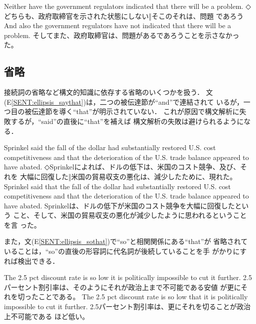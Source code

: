 \begin{SENT}
\sentE Neither have the government regulators indicated that there will 
be a problem.
\sentJ ◇どちらも、政府取締官を示された状態にしない‖そこのそれは、問題
であろう
\sentNewE And also the government regulators have not indicated 
that there will be a problem.
\sentNewJ そしてまた、政府取締官は、問題があるであろうことを示さなかった。
\label{SENT:inversion_neither}
\end{SENT}

\subsection{省略}
\label{sec:object:ellipsis}

接続詞の省略など構文的知識に依存する省略のいくつかを扱う．
文(E\ref{SENT:ellipsis_saythat})は，二つの被伝達節が``and''で連結されて
いるが，一つ目の被伝達節を導く``that''が明示されていない．
これが原因で構文解析に失敗するが，``said''の直後に``that''を補えば
構文解析の失敗は避けられるようになる．
\begin{SENT}
\sentE Sprinkel said the fall of the dollar had substantially restored 
U.S. cost competitiveness and that the deterioration of the U.S. trade 
balance appeared to have abated. 
\sentJ ◇Sprinkelによれば、ドルの低下は、米国のコスト競争、及び、それを
大幅に回復した‖米国の貿易収支の悪化は、減少したために、現れた。
\sentNewE Sprinkel said that the fall of the dollar had substantially 
restored U.S. cost competitiveness and that the deterioration of the U.S. 
trade balance appeared to have abated.
\sentNewJ Sprinkelは、ドルの低下が米国のコスト競争を大幅に回復したという
こと、そして、米国の貿易収支の悪化が減少したように思われるということを言
った。 
\label{SENT:ellipsis_saythat}
\end{SENT}

また，文(E\ref{SENT:ellipsis_sothat})で``so''と相関関係にある``that''が
省略されていることは，``so''の直後の形容詞に代名詞が後続していることを手
がかりにすれば検出できる．
\begin{SENT}
\sentE The 2.5 pct discount rate is so low it is politically impossible 
to cut it further. 
\sentJ 2.5パーセント割引率は、そのようにそれが政治上まで不可能である安値
が更にそれを切ったことである。
\sentNewE The 2.5 pct discount rate is so low that it is politically
impossible to cut it further.
\sentNewJ 2.5パーセント割引率は、更にそれを切ることが政治上不可能である
ほど低い。
\label{SENT:ellipsis_sothat}
\end{SENT}

